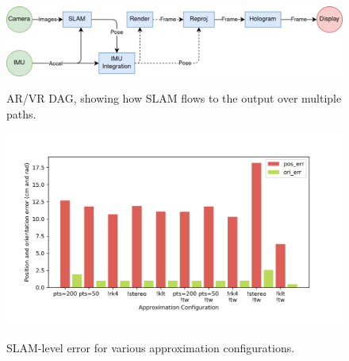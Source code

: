 \begin{figure}[H]
  \caption{AR/VR DAG, showing how SLAM flows to the output over multiple paths.}
  \includegraphics[width=\columnwidth]{dag.png}
  \label{dag}
\end{figure}

\begin{figure}[H]
  \caption{SLAM-level error for various approximation configurations.}
  \includegraphics[width=\columnwidth]{slam_errors.png}
  \label{SLAM-level-errors}
\end{figure}

